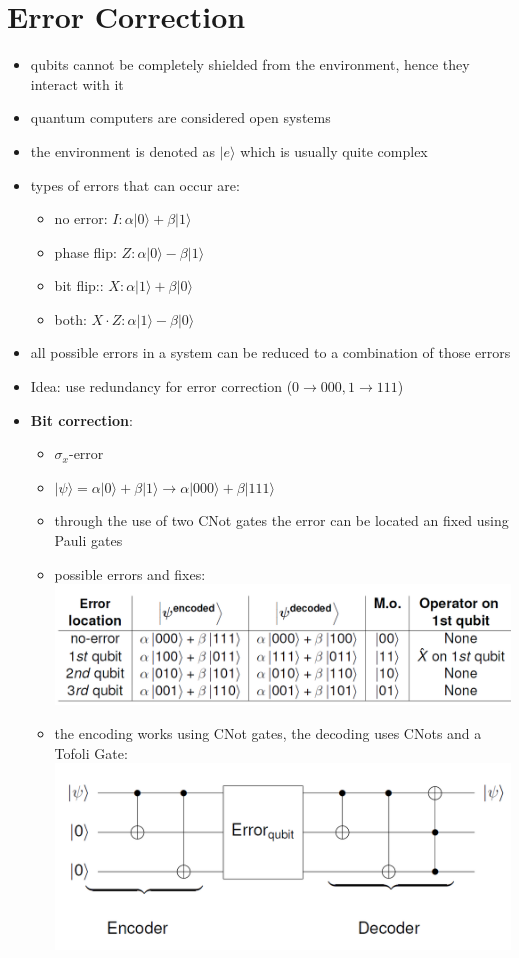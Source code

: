 \documentclass[12pt,a4paper]{article}
\newcommand{\ket}[1]{\vert #1 \rangle}
\begin{document}
\section{Error Correction}
\begin{itemize}
\item qubits cannot be completely shielded from the environment, hence they interact with it
\item quantum computers are considered open systems
\item the environment is denoted as $\ket{e}$ which is usually quite complex
\item types of errors that can occur are:
\begin{itemize}
\item no error: $I: \alpha\ket{0}+\beta\ket{1}$
\item phase flip: $Z: \alpha\ket{0}-\beta\ket{1}$
\item bit flip:: $X: \alpha\ket{1}+\beta\ket{0}$
\item both: $X\cdot Z: \alpha\ket{1}-\beta\ket{0}$
\end{itemize}
\item all possible errors in a system can be reduced to a combination of those errors
\item Idea: use redundancy for error correction ($0 \rightarrow 000, 1 \rightarrow 111$)
\item \textbf{Bit correction}:
\begin{itemize}
\item $\sigma_x$-error
\item $\ket{\psi} = \alpha\ket{0}+\beta\ket{1} \rightarrow \alpha\ket{000}+\beta\ket{111}$
\item through the use of two CNot gates the error can be located an fixed using Pauli gates
\item possible errors and fixes:\\\includegraphics[scale=0.3]{./resources/bitcorrect.png}
\item the encoding works using CNot gates, the decoding uses CNots and a Tofoli Gate:\\\includegraphics[scale=0.3]{./resources/bitcirc.png}

\end{itemize}
\end{itemize}
\end{document}
